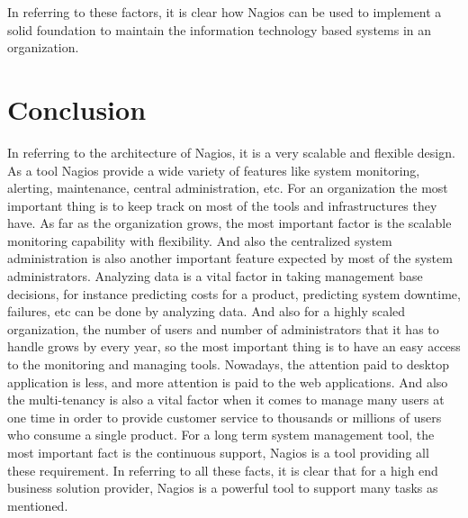 \documentclass[9pt,twocolumn,twoside]{styles/osajnl}
\begin{document}
In referring to these factors, it is clear how Nagios can be used to implement a solid foundation to maintain the information technology based systems in an organization.

\section{Conclusion}

In referring to the architecture of Nagios, it is a very scalable and flexible design. As a tool Nagios provide a wide variety of features like system monitoring, alerting, maintenance, central administration, etc. For an organization the most important thing is to keep track on most of the tools and infrastructures they have. As far as the organization grows, the most important factor is the scalable monitoring capability with flexibility. And also the centralized system administration is also another important feature expected by most of the system administrators. Analyzing data is a vital factor in taking management base decisions, for instance predicting costs for a product, predicting system downtime, failures, etc can be done by analyzing data. And also for a highly scaled organization, the number of users and number of administrators that it has to handle grows by every year, so the most important thing is to have an easy access to the monitoring and managing tools. Nowadays, the attention paid to desktop application is less, and more attention is paid to the web applications. And also the multi-tenancy is also a vital factor when it comes to manage many users at one time in order to provide customer service to thousands or millions of users who consume a single product. For a long term system management tool, the most important fact is the continuous support, Nagios is a tool providing all these requirement. In referring to all these facts, it is clear that for a high end business solution provider, Nagios is a powerful tool to support many tasks as mentioned. 







 



\appendix 
\end{document}
